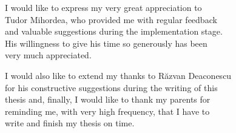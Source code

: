 \vspace*{7cm}
\begin{center}
I would like to express my very great appreciation to\\
Tudor Mihordea, who provided me with regular feedback\\
and valuable suggestions during the implementation stage.\\
His willingness to give his time so generously has been\\
very much appreciated.\\
\end{center}
\vspace{0.6cm}
\begin{center}
I would also like to extend my thanks to Răzvan Deaconescu\\
for his constructive suggestions during the writing of this\\
thesis and, finally, I would like to thank my parents for\\
reminding me, with very high frequency, that I have to\\
write and finish my thesis on time.\\
\end{center}
